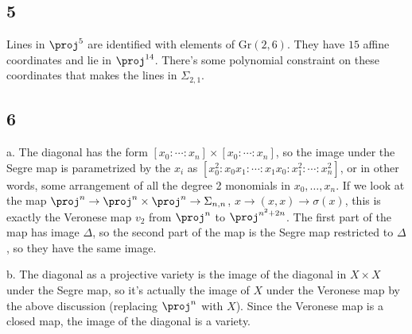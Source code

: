 \documentclass{article}
\begin{document}
\subsection*{5}
Lines in $\proj^5$ are identified with elements of Gr$(2,6)$. They have $15$ affine coordinates and lie in $\proj^{14}$. There's some polynomial constraint on these coordinates that makes the lines in $\Sigma_{2,1}$. 
\subsection*{6}
a. The diagonal has the form $[x_0:\cdots:x_n]\times[x_0:\cdots:x_n]$, so the image under the Segre map is parametrized by the $x_i$ as $[x_0^2:x_0x_1:\cdots:x_1x_0:x_1^2:\cdots:x_n^2]$, or in other words, some arrangement of all the degree 2 monomials in $x_0,\ldots,x_n$. If we look at the map $\proj^n\to\proj^n\times\proj^n\to\Sigma_{n,n}$, $x\to(x,x)\to\sigma(x)$, this is exactly the Veronese map $v_2$ from $\proj^n$ to $\proj^{n^2+2n}$. The first part of the map has image $\Delta$, so the second part of the map is the Segre map restricted to $\Delta$, so they have the same image.

b. The diagonal as a projective variety is the image of the diagonal in $X\times X$ under the Segre map, so it's actually the image of $X$ under the Veronese map by the above discussion (replacing $\proj^n$ with $X$). Since the Veronese map is a closed map, the image of the diagonal is a variety.
\end{document}
